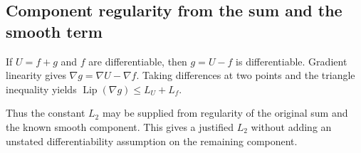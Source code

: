 \documentclass[11pt,a4paper]{report}
\begin{document}
\subsection{\texorpdfstring{Component regularity from the sum and the smooth term}{Component regularity from the sum and the smooth term}}
\label{report-step-ProximalLangevin-MeanFieldSmoothing-lean-3}


If \(U=f+g\) and \(f\) are differentiable, then \(g=U-f\) is differentiable. Gradient linearity gives \(\nabla g=\nabla U-\nabla f\). Taking differences at two points and the triangle inequality yields \(\operatorname{Lip}(\nabla g)\le L_U+L_f\).



Thus the constant \(L_2\) may be supplied from regularity of the original sum and the known smooth component. This gives a justified \(L_2\) without adding an unstated differentiability assumption on the remaining component.
\end{document}
